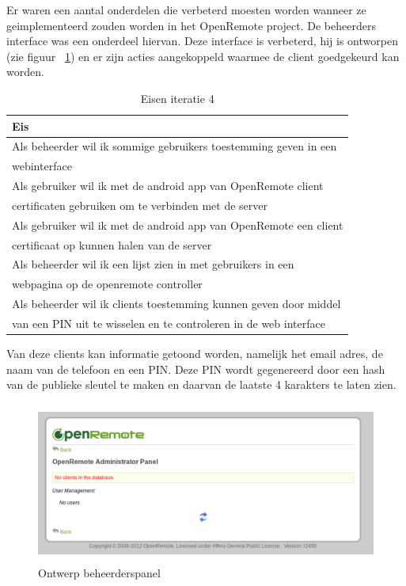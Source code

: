 \documentclass[]{article}
\begin{document}
Er waren een aantal onderdelen die verbeterd moesten worden wanneer ze
geimplementeerd zouden worden in het OpenRemote project. De beheerders
interface was een onderdeel hiervan. Deze interface is verbeterd, hij is
ontworpen (zie figuur ~\ref{fig:adminv1}) en er zijn acties aangekoppeld waarmee de client
goedgekeurd kan worden.

\begin{table}[htpb]
  \caption{Eisen iteratie 4}
  \begin{center}
    \begin{tabular}{|| l ||}\hline
        Eis                                                              \\\hline\hline
        Als beheerder wil ik sommige gebruikers toestemming geven in een \\ 
        webinterface                                                     \\\hline
        Als gebruiker wil ik met de android app van OpenRemote client    \\ 
        certificaten gebruiken om te verbinden met de server             \\\hline
        Als gebruiker wil ik met de android app van OpenRemote een client\\
        certificaat op kunnen halen van de server                        \\\hline
        Als beheerder wil ik een lijst zien in met gebruikers in een     \\ 
        webpagina op de openremote controller                            \\\hline
        Als beheerder wil ik clients toestemming kunnen geven door middel\\ 
        van een PIN uit te wisselen en te controleren in de web interface\\\hline
    \end{tabular}
  \end{center}
\end{table}

Van deze clients kan informatie getoond worden, namelijk het email adres,
de naam van de telefoon en een PIN. Deze PIN wordt gegenereerd door een
hash van de publieke sleutel te maken en daarvan de laatste 4 karakters te
laten zien.

\begin{figure}[h!]
  \centering
    \includegraphics[height=150pt,keepaspectratio]{adminv1.pdf}
  \caption{Ontwerp beheerderspanel}
  \label{fig:adminv1}
\end{figure}
\end{document}

